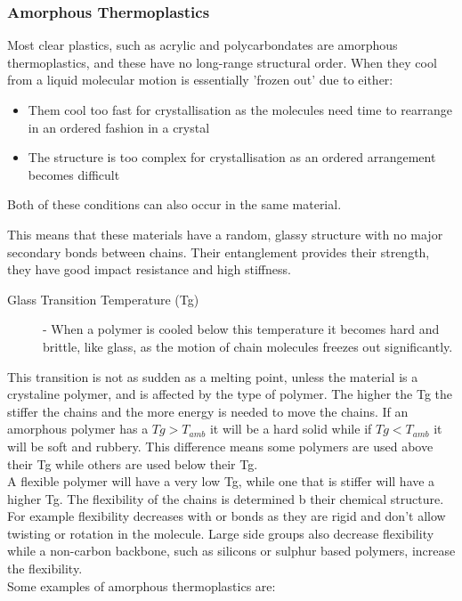 \documentclass[a4paper, 12pt]{article}
\begin{document}
		\subsubsection{Amorphous Thermoplastics}
			Most clear plastics, such as acrylic and polycarbondates are amorphous thermoplastics, and these have no long-range structural order. When they cool from a liquid molecular motion is essentially 'frozen out' due to either:
			\begin{itemize}
				\item Them cool too fast for crystallisation as the molecules need time to rearrange in an ordered fashion in a crystal
				\item The structure is too complex for crystallisation as an ordered arrangement becomes difficult
			\end{itemize}
			Both of these conditions can also occur in the same material. \\
			\par
			This means that these materials have a random, glassy structure with no major secondary bonds between chains. Their entanglement provides their strength, they have good impact resistance and high stiffness.
			\begin{description}
				\item[Glass Transition Temperature (Tg)] - When a polymer is cooled below this temperature it becomes hard and brittle, like glass, as the motion of chain molecules freezes out significantly. 
			\end{description}
			This transition is not as sudden as a melting point, unless the material is a crystaline polymer, and is affected by the type of polymer. The higher the Tg the stiffer the chains and the more energy is needed to move the chains. If an amorphous polymer has a $Tg > T_{amb}$ it will be a hard solid while if $Tg < T_{amb}$ it will be soft and rubbery. This difference means some polymers are used above their Tg while others are used below their Tg. \\ 
			A flexible polymer will have a very low Tg, while one that is stiffer will have a higher Tg. The flexibility of the chains is determined b their chemical structure. For example flexibility decreases with  or  bonds as they are rigid and don't allow twisting or rotation in the molecule. Large side groups also decrease flexibility while a non-carbon backbone, such as silicons or sulphur based polymers, increase the flexibility. \\
			Some examples of amorphous thermoplastics are: \\ \\
\end{document}
